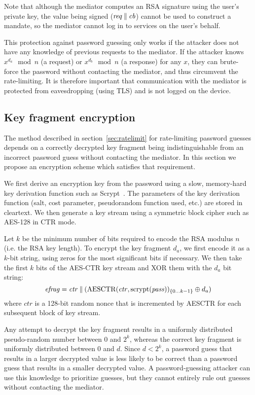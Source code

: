Note that although the mediator computes an RSA signature using the user's private key, the value
being signed ($\mathit{req} \mathbin{\|} \mathit{cb}$) cannot be used to construct a mandate, so the
mediator cannot log in to services on the user's behalf.

This protection against password guessing only works if the attacker does not have any knowledge of
previous requests to the mediator. If the attacker knows $x^{d_a} \mod n$ (a request) or
$x^{d_b} \mod n$ (a response) for any $x$, they can brute-force the password without contacting the
mediator, and thus circumvent the rate-limiting.  It is therefore important that communication with
the mediator is protected from eavesdropping (using TLS) and is not logged on the device.

\subsection{Key fragment encryption}\label{sec:fragmentenc}

The method described in section~\ref{sec:ratelimit} for rate-limiting password guesses depends on a
correctly decrypted key fragment being indistinguishable from an incorrect password guess without
contacting the mediator. In this section we propose an encryption scheme which satisfies that
requirement.

We first derive an encryption key from the password using a slow, memory-hard key derivation
function such as Scrypt~\cite{Percival09}. The parameters of the key derivation function (salt, cost
parameter, pseudorandom function used, etc.) are stored in cleartext. We then generate a key stream
using a symmetric block cipher such as AES-128 in CTR mode.~\cite{Lipmaa00}

Let $k$ be the minimum number of bits required to encode the RSA modulus $n$ (i.e. the RSA key
length). To encrypt the key fragment $d_a$, we first encode it as a $k$-bit string, using zeros for
the most significant bits if necessary. We then take the first $k$ bits of the AES-CTR key stream
and XOR them with the $d_a$ bit string:
$$\mathit{efrag} = \mathit{ctr} \mathbin{\|}
    (\mathrm{AESCTR}(\mathit{ctr}, \mathrm{scrypt}(\mathit{pass}))_{\{0 \dots k-1\}} \oplus d_a)$$
where $\mathit{ctr}$ is a 128-bit random nonce that is incremented by AESCTR for each subsequent
block of key stream.

Any attempt to decrypt the key fragment results in a uniformly distributed pseudo-random number
between 0 and $2^k$, whereas the correct key fragment is uniformly distributed between 0 and $d$.
Since $d < 2^k$, a password guess that results in a larger decrypted value is less likely to be
correct than a password guess that results in a smaller decrypted value. A password-guessing
attacker can use this knowledge to prioritize guesses, but they cannot entirely rule out guesses
without contacting the mediator.

